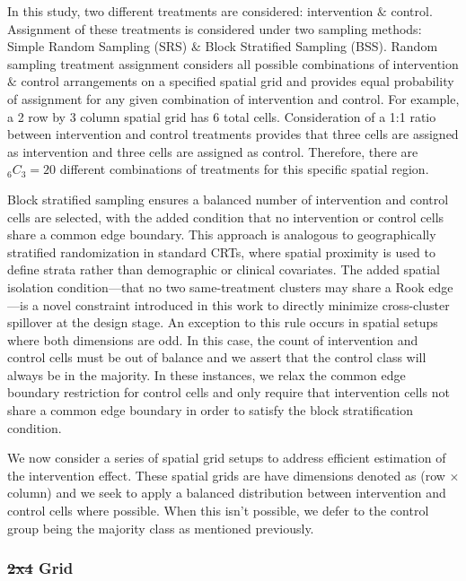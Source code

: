 \documentclass{article}[11pt]
\makeatletter
\providecommand{\DIFaddtex}[1]{{\protect\color{blue}\uwave{#1}}} %
\providecommand{\DIFdeltex}[1]{{\protect\color{red}\sout{#1}}} %
\providecommand{\DIFaddbegin}{} %
\providecommand{\DIFaddend}{} %
\providecommand{\DIFdelbegin}{} %
\providecommand{\DIFdelend}{} %
\providecommand{\DIFadd}[1]{\texorpdfstring{\DIFaddtex{#1}}{#1}} %
\providecommand{\DIFdel}[1]{\texorpdfstring{\DIFdeltex{#1}}{}} %
\providecommand{\DIFscaledelfig}{0.5}
\newlength{\DIFdelgraphicswidth} %
\newlength{\DIFdelgraphicsheight} %
\providecommand{\DIFaddincludegraphics}[2][]{{\color{blue}\fbox{\DIFOincludegraphics[#1]{#2}}}} %
\providecommand{\DIFdelincludegraphics}[2][]{%
\sbox{\DIFdelgraphicsbox}{\DIFOincludegraphics[#1]{#2}}%
\settoboxwidth{\DIFdelgraphicswidth}{\DIFdelgraphicsbox} %
\settoboxtotalheight{\DIFdelgraphicsheight}{\DIFdelgraphicsbox} %
\scalebox{\DIFscaledelfig}{%
\parbox[b]{\DIFdelgraphicswidth}{\usebox{\DIFdelgraphicsbox}\\[-\baselineskip] \rule{\DIFdelgraphicswidth}{0em}}\llap{\resizebox{\DIFdelgraphicswidth}{\DIFdelgraphicsheight}{%
\setlength{\unitlength}{\DIFdelgraphicswidth}%
\begin{picture}(1,1)%
\thicklines\linethickness{2pt} %
{\color[rgb]{1,0,0}\put(0,0){\framebox(1,1){}}}%
{\color[rgb]{1,0,0}\put(0,0){\line( 1,1){1}}}%
{\color[rgb]{1,0,0}\put(0,1){\line(1,-1){1}}}%
\end{picture}%
}\hspace*{3pt}}} %
} %
\DeclareRobustCommand{\DIFaddbegin}{\DIFOaddbegin \let\includegraphics\DIFaddincludegraphics} %
\DeclareRobustCommand{\DIFaddend}{\DIFOaddend \let\includegraphics\DIFOincludegraphics} %
\DeclareRobustCommand{\DIFdelbegin}{\DIFOdelbegin \let\includegraphics\DIFdelincludegraphics} %
\DeclareRobustCommand{\DIFdelend}{\DIFOaddend \let\includegraphics\DIFOincludegraphics} %
\let\sout@orig\sout %
\renewcommand{\sout}[1]{\ifmmode\text{\sout@orig{\ensuremath{#1}}}\else\sout@orig{#1}\fi} %
\makeatother
\begin{document}
In this study, two different treatments are considered: intervention $\&$ control. Assignment of these treatments is considered under two sampling methods: Simple Random Sampling (SRS) $\&$ Block Stratified Sampling (BSS). Random sampling treatment assignment considers all possible combinations of intervention $\&$ control arrangements on a specified spatial grid and provides equal probability of assignment for any given combination of intervention and control. For example, a 2 row by 3 column spatial grid has 6 total cells. Consideration of a 1:1 ratio between intervention and control treatments provides that three cells are assigned as intervention and three cells are assigned as control. Therefore, there are %
$_{6}C_{3}=20$ different combinations of treatments for this specific spatial region. 

Block stratified sampling ensures a balanced number of intervention and control cells are selected, with the added condition that no intervention or control cells share a common edge boundary. This approach is analogous to geographically stratified randomization in standard CRTs, where spatial proximity is used to define strata rather than demographic or clinical covariates\cite{mccann_spatial_2018}\cite{crisp_covariate-constrained_2023}\cite{hayes_cluster_2017}. The added spatial isolation condition---that no two same-treatment clusters may share a Rook edge---is a novel constraint introduced in this work to directly minimize cross-cluster spillover at the design stage. An exception to this rule occurs in spatial setups where both dimensions are odd. In this case, the count of intervention and control cells must be out of balance and we assert that the control class will always be in the majority. In these instances, we relax the common edge boundary restriction for control cells and only require that intervention cells not share a common edge boundary in order to satisfy the block stratification condition.

We now consider a series of spatial grid setups to address efficient estimation of the intervention effect. These spatial grids are have dimensions denoted as (row $\times$ column) and we seek to apply a balanced distribution between intervention and control cells where possible. When this isn't possible, we defer to the control group being the majority class as mentioned previously.

\subsubsection{\DIFdelbegin \DIFdel{2x4 }\DIFdelend Grid \DIFaddbegin \DIFadd{geometries and allocation counts}\DIFaddend }
\end{document}
